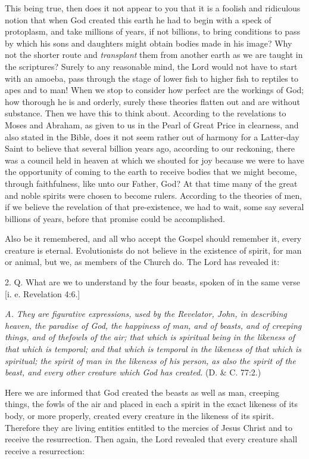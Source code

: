 This being true, then does it not appear to you that it is a foolish and ridiculous notion that
when God created this earth he had to begin with a speck of protoplasm, and take millions of
years, if not billions, to bring conditions to pass by which his sons and daughters might
obtain bodies made in his image? Why not the shorter route and \textit{transplant} them from
another earth as we are taught in the scriptures? Surely to any reasonable mind, the Lord
would not have to start with an amoeba, pass through the stage of lower fish to higher fish to
reptiles to apes and to man! When we stop to consider how perfect are the workings of God;
how thorough he is and orderly, surely these theories flatten out and are without substance.
Then we have this to think about. According to the revelations to Moses and Abraham, as
given to us in the Pearl of Great Price in clearness, and also stated in the Bible, does it not
seem rather out of harmony for a Latter-day Saint to believe that several billion years ago,
according to our reckoning, there was a council held in heaven at which we shouted for joy
because we were to have the opportunity of coming to the earth to receive bodies that we
might become, through faithfulness, like unto our Father, God? At that time many of the
great and noble spirits were chosen to become rulers. According to the theories of men, if we
believe the revelation of that pre-existence, we had to wait, some say several billions of
years, before that promise could be accomplished.

Also be it remembered, and all who accept the Gospel should remember it, every creature is
eternal. Evolutionists do not believe in the existence of spirit, for man or animal, but we, as
members of the Church do. The Lord has revealed it:

2. Q. What are we to understand by the four beasts, spoken of in the same verse [i. e.
Revelation 4:6.]

\textit{A. They are figurative expressions, used by the Revelator, John, in describing heaven, the
paradise of God, the happiness of man, and of beasts, and of creeping things, and of thefowls of the air; that which is spiritual being in the likeness of that which is temporal; and
that which is temporal in the likeness of that which is spiritual; the spirit of man in the
likeness of his person, as also the spirit of the beast, and every other creature which God has
created.} (D. \& C. 77:2.)

Here we are informed that God created the beasts as well as man, creeping things, the fowls
of the air and placed in each a spirit in the exact likeness of its body, or more properly,
created every creature in the likeness of its spirit. Therefore they are living entities entitled to
the mercies of Jesus Christ and to receive the resurrection. Then again, the Lord revealed that
every creature shall receive a resurrection:

